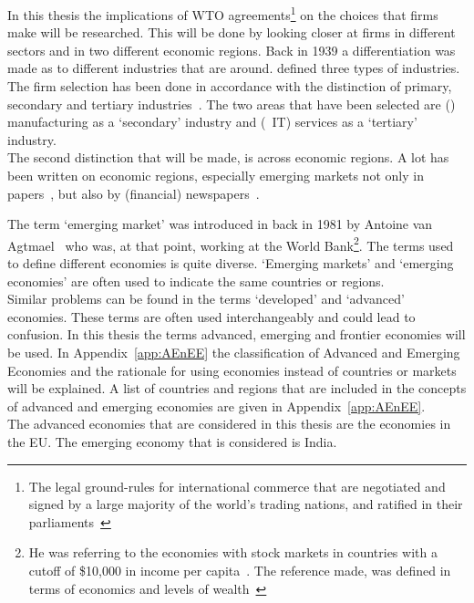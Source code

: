 In this thesis the implications of WTO agreements\footnote{The legal ground-rules for international commerce that are negotiated and signed by a large majority of the world’s trading nations, and ratified in their parliaments~\citep{WTO:2013Whatis}} on the choices that firms make will be researched.
This will be done by looking closer at firms in different sectors and in two different economic regions.
Back in 1939 a differentiation was made as to different industries that are around. 
\cite{Fisher:1939} defined three types of industries.
The firm selection has been done in accordance with the distinction of primary, secondary and tertiary industries~\citep{Fisher:1939}.
The two areas that have been selected are (\pharma) manufacturing as a `secondary' industry and (~\gls{IT}) services as a `tertiary' industry.\\
The second distinction that will be made, is across economic regions.
A lot has been written on economic regions, especially emerging markets not only in papers~\citep{Nielsen:2011vq,Hoskisson:2000wd,Meyer:2009ue,Gao:2009df,Peng:2008tb}, but also by (financial) newspapers~\citep{DW:2011,FT:2006,The-Economist:2013}. 

The term `emerging market' was introduced in back in 1981 by Antoine van Agtmael~\citep{The-Economist:2010,Bloomberg:2010} who was, at that point, working at the World Bank\footnote{He was referring to the economies with stock markets in countries with a cutoff of \$10,000 in income per capita~\cite{Pennsylvania:2008}.
The reference made, was defined in terms of economics and levels of wealth~\cite{FT:2006}}.
The terms used to define different economies is quite diverse. 
`Emerging markets' and `emerging economies' are often used to indicate the same countries or regions.\\
Similar problems can be found in the terms `developed' and `advanced' economies. 
These terms are often used interchangeably and could lead to confusion.
In this thesis the terms advanced, emerging and frontier economies will be used.
In Appendix~\ref{app:AEnEE} the classification of Advanced and Emerging Economies and the rationale for using economies instead of countries or markets will be explained.
A list of countries and regions that are included in the concepts of advanced and emerging economies are given in Appendix~\ref{app:AEnEE}.\\
The advanced economies that are considered in this thesis are the economies in the \gls{EU}.
The emerging economy that is considered is India.

